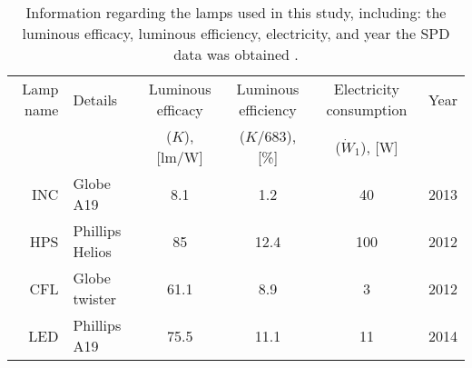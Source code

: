 

\begin{table}
\centering %
\caption{Information regarding the lamps used in this study, including: 
the luminous efficacy, luminous efficiency, electricity,
and year the SPD data was obtained \cite{aube2013}.}
\begin{tabular}{r l c c c c}
  \toprule
  Lamp name 
      & Details 
      & Luminous efficacy 
      & Luminous efficiency
      & Electricity consumption 
      & Year  \\
  
      &
      & ($K$), [lm/W]
      & ($K/683$), [\%]
      & ($\dot{W}_1$), [W] 
      & \\
  \midrule
  INC
      & Globe A19
      & 8.1
      & 1.2
      & 40
      & 2013\\
  HPS   
      & Phillips Helios
      & 85
      & 12.4
      & 100
      & 2012 \\
  CFL
      & Globe twister
      & 61.1
      & 8.9
      & 3
      & 2012 \\
  LED
      & Phillips A19
      & 75.5
      & 11.1
      & 11
      & 2014 \\
  \bottomrule
\end{tabular}
\label{tab:lamps}
\end{table}

